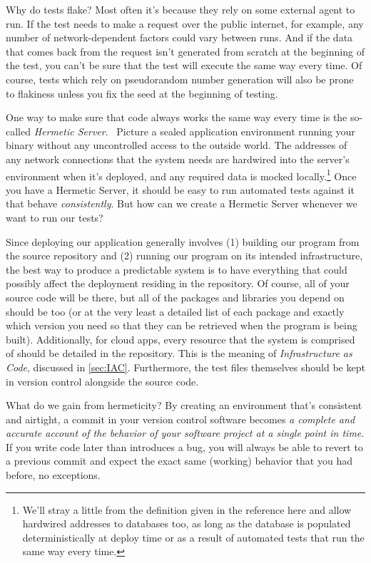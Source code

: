 \documentclass{article}
\newcommand{\noterm}[1]{\textit{#1}}
\newcommand{\term}[1]{\noterm{#1}\index{#1}}
\begin{document}
Why do tests flake?
Most often it's because they rely on some external agent to run.
If the test needs to make a request over the public internet, for example, any number of network-dependent factors could vary between runs.
And if the data that comes back from the request isn't generated from scratch at the beginning of the test, you can't be sure that the test will execute the same way every time.
Of course, tests which rely on pseudorandom number generation will also be prone to flakiness unless you fix the seed at the beginning of testing.

One way to make sure that code always works the same way every time is the so-called \term{Hermetic Server}.~\cite{google-hermetic-servers}
Picture a sealed application environment running your binary without any uncontrolled access to the outside world.
The addresses of any network connections that the system needs are hardwired into the server's environment when it's deployed, and any required data is mocked locally.\footnote{
  We'll stray a little from the definition given in the reference here and allow hardwired addresses to databases too, as long as the database is populated deterministically at deploy time or as a result of automated tests that run the same way every time.
}
Once you have a Hermetic Server, it should be easy to run automated tests against it that behave \term{consistently}.
But how can we create a Hermetic Server whenever we want to run our tests?

Since deploying our application generally involves (1) building our program from the source repository and (2) running our program on its intended infrastructure, the best way to produce a predictable system is to have everything that could possibly affect the deployment residing in the repository.
Of course, all of your source code will be there, but all of the packages and libraries you depend on should be too (or at the very least a detailed list of each package and exactly which version you need so that they can be retrieved when the program is being built).
Additionally, for cloud apps, every resource that the system is comprised of should be detailed in the repository.
This is the meaning of \term{Infrastructure as Code}, discussed in \ref{sec:IAC}.
Furthermore, the test files themselves should be kept in version control alongside the source code.

What do we gain from hermeticity?
By creating an environment that's consistent and airtight, a commit in your version control software becomes \textit{a complete and accurate account of the behavior of your software project at a single point in time}.
If you write code later than introduces a bug, you will always be able to revert to a previous commit and expect the exact same (working) behavior that you had before, no exceptions.
\end{document}
